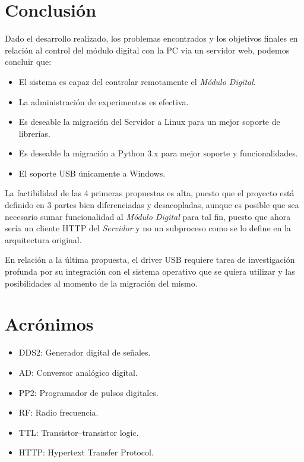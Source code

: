 \section{Conclusi\'on}

Dado el desarrollo realizado, los problemas encontrados y los objetivos finales en relaci\'on
al control del m\'odulo digital con la PC via un servidor web, podemos concluir que:

\begin{itemize}
    \item El sistema es capaz del controlar remotamente el \textit{M\'odulo Digital}.
    \item La administraci\'on de experimentos es efectiva.
    \item Es deseable la migraci\'on del Servidor a Linux para un mejor soporte de librer\'ias.
    \item Es deseable la migraci\'on a Python 3.x para mejor soporte y funcionalidades.
    \item El soporte USB \'unicamente a Windows.
\end{itemize}

La factibilidad de las 4 primeras propuestas es alta, puesto que el proyecto est\'a definido en 3 partes
bien diferenciadas y desacopladas, aunque es posible que sea necesario sumar funcionalidad 
al \textit{M\'odulo Digital} para tal fin, puesto que ahora ser\'ia un cliente HTTP del \textit{Servidor} y
no un subproceso como se lo define en la arquitectura original.

En relaci\'on a la \'ultima propuesta, el driver USB requiere tarea de investigaci\'on profunda por su integraci\'on con el
sistema operativo que se quiera utilizar y las posibilidades al momento de la migraci\'on del mismo.

\newpage

\section{Acr\'onimos}

\begin{itemize}
    \item DDS2: Generador digital de se\~nales.
    \item AD: Conversor anal\'ogico digital.
    \item PP2: Programador de pulsos digitales.
    \item RF: Radio frecuencia.
    \item TTL: Transistor–transistor logic.
    \item HTTP: Hypertext Transfer Protocol.
\end{itemize}

\newpage